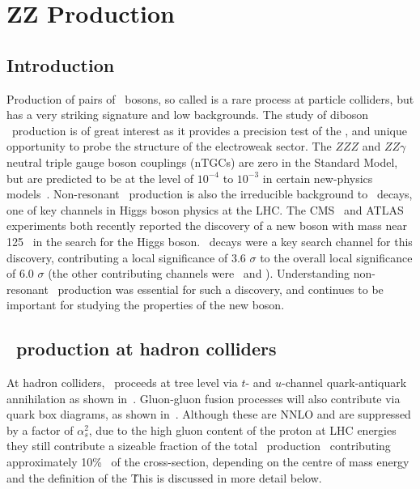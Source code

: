 \graphicspath{{Chapters/TheoryZZProduction/Figures/}}
\chapter{ZZ Production}
\label{chap:TheoryZZProduction}

\section{Introduction}

Production of pairs of \Z\ bosons, so called  is a
rare process at particle colliders, but has a very striking signature
and low backgrounds. The study of diboson \ZZ\ production is of great interest
as it provides a precision test of the \sm, and unique opportunity to
probe the structure of the electroweak sector. 
The $ZZZ$ and $ZZ\gamma$ neutral triple gauge boson
couplings (nTGCs) are zero in the Standard Model, but are predicted to be at the
level of $10^{-4}$ to $10^{-3}$ in certain new-physics
models~\cite{Ellison:1998}. Non-resonant \ZZ\ production is also the
irreducible background to \HZZ\ decays, one of key channels in Higgs boson physics
at the LHC. The CMS~\cite{CMS_Higgs:2012gu} and ATLAS~\cite{ATLAS_Higgs:2012gk}
experiments both recently reported the discovery of a new boson with mass near
125 \gev\ in the search for the Higgs boson. \HZZ\ decays were a key
search channel for this discovery, contributing a local significance of 3.6
$\sigma$ to the overall local significance of 6.0 $\sigma$ (the other
contributing channels were \Hgg\ and \HWW). Understanding non-resonant \ZZ\
production was essential for such a discovery, and continues to be important for
studying the properties of the new boson.

\section{\ZZ\ production at hadron colliders}

At hadron colliders, \qqZZ\ proceeds at tree level via $t$- and $u$-channel
quark-antiquark annihilation as shown in~\fig{theoryzz-fd-qqZZ}. 
Gluon-gluon fusion processes will also
contribute via quark box diagrams, as shown in~. Although
these are NNLO and are suppressed by a factor of
$\alpha_s^2$, due to the high gluon content of the proton at LHC energies they
still contribute a sizeable fraction of the total \ZZ\ production \cx\,
contributing approximately 10\%~\cite{Campbell:2011} of the cross-section,
depending on the centre of mass energy and the definition of the \cx\.
This is discussed in more detail below.


